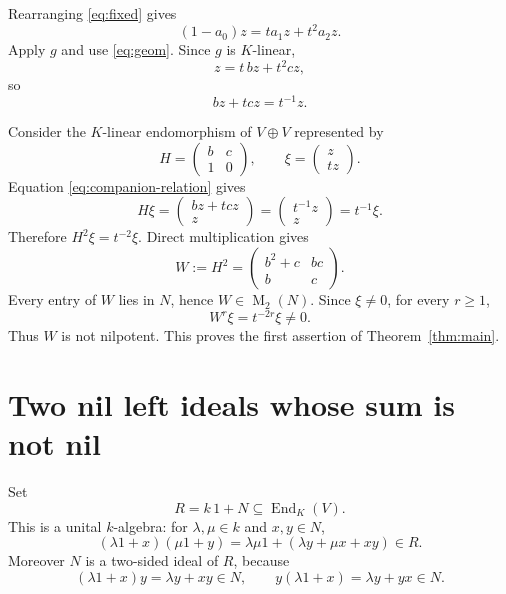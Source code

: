 \documentclass[11pt]{article}
\newcommand{\End}{\operatorname{End}}
\newcommand{\Mat}{\operatorname{M}}
\begin{document}
Rearranging \eqref{eq:fixed} gives
\[
(1-a_0)z=t a_1z+t^2a_2z.
\]
Apply $g$ and use \eqref{eq:geom}.  Since $g$ is $K$-linear,
\[
z=t\,bz+t^2cz,
\]
so
\begin{equation}\label{eq:companion-relation}
bz+tcz=t^{-1}z.
\end{equation}

Consider the $K$-linear endomorphism of $V\oplus V$ represented by
\[
H=
\begin{pmatrix}
b&c\\
1&0
\end{pmatrix},
\qquad
\xi=
\begin{pmatrix}
z\\tz
\end{pmatrix}.
\]
Equation \eqref{eq:companion-relation} gives
\[
H\xi
=
\begin{pmatrix}
bz+tcz\\z
\end{pmatrix}
=
\begin{pmatrix}
t^{-1}z\\z
\end{pmatrix}
=t^{-1}\xi.
\]
Therefore $H^2\xi=t^{-2}\xi$.  Direct multiplication gives
\begin{equation}\label{eq:W}
W:=H^2
=
\begin{pmatrix}
b^2+c&bc\\
b&c
\end{pmatrix}.
\end{equation}
Every entry of $W$ lies in $N$, hence $W\in\Mat_2(N)$.  Since $\xi\ne0$, for every $r\ge1$,
\[
W^r\xi=t^{-2r}\xi\ne0.
\]
Thus $W$ is not nilpotent.  This proves the first assertion of Theorem~\ref{thm:main}.

\section{Two nil left ideals whose sum is not nil}\label{sec:kothe}

Set
\[
R=k\,1+N\subseteq\End_K(V).
\]
This is a unital $k$-algebra: for $\lambda,\mu\in k$ and $x,y\in N$,
\[
(\lambda1+x)(\mu1+y)=\lambda\mu1+(\lambda y+\mu x+xy)\in R.
\]
Moreover $N$ is a two-sided ideal of $R$, because
\[
(\lambda1+x)y=\lambda y+xy\in N,
\qquad
y(\lambda1+x)=\lambda y+yx\in N.
\]
\end{document}
